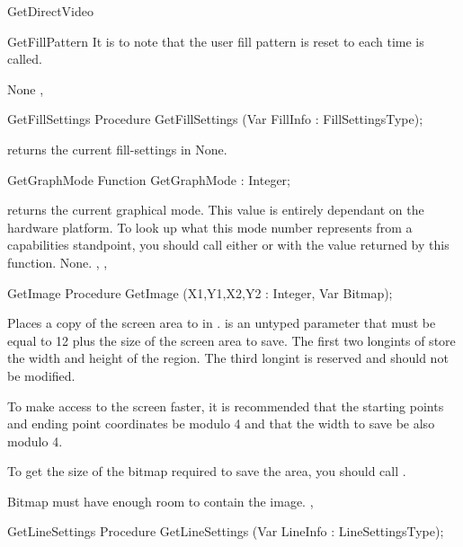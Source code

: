 \begin{function}{GetDirectVideo}
\begin{procedure}{GetFillPattern}
It is to note that the user fill pattern is reset to  each time
 is called.

\Errors
None
\SeeAlso
{}, 
\end{procedure}

\begin{procedure}{GetFillSettings}
\Declaration
Procedure GetFillSettings (Var FillInfo : FillSettingsType);

\Description
{} returns the current fill-settings in
\Errors
None.
\SeeAlso
{}
\end{procedure}

\begin{function}{GetGraphMode}
\Declaration
Function GetGraphMode  : Integer;

\Description
{} returns the current graphical mode. This value is
entirely dependant on the hardware platform. To look up what this
mode number represents from a capabilities standpoint, you should
call either  or  with the
value returned by this function.
\Errors
None.
\SeeAlso
{}, , 
\end{function}

\begin{procedure}{GetImage}
\Declaration
Procedure GetImage (X1,Y1,X2,Y2 : Integer, Var Bitmap);

\Description
{}
Places a copy of the screen area  to  in .
 is an untyped parameter that must be equal to 12 plus the size
of the screen area to save. The first two longints of  store
the width and height of the region. The third longint is reserved and should
not be modified.

To make access to the screen faster, it is recommended that the starting
points and ending point coordinates be modulo 4 and that the width to
save be also modulo 4.

To get the size of the bitmap required to save the area, you should call
.

\Errors
Bitmap must have enough room to contain the image.
\SeeAlso
{},
\end{procedure}

\begin{procedure}{GetLineSettings}
\Declaration
Procedure GetLineSettings (Var LineInfo : LineSettingsType);


\end{procedure}
\end{function}

